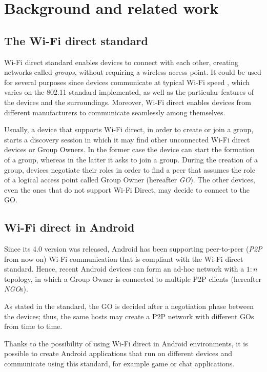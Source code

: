 \section{Background and related work} %
\subsection{The Wi-Fi direct standard}
Wi-Fi direct standard enables devices to connect with each other, creating 
networks called \textit{groups}, without requiring a wireless access point. It
could be used for several purposes since devices communicate at typical Wi-Fi
speed \cite{bib:wifiP2pspec}, which varies on the 802.11 standard implemented,
as well as the particular features of the devices and the surroundings.
Moreover, Wi-Fi direct enables devices from different manufacturers to
communicate seamlessly among themselves.

Usually, a device that supports Wi-Fi direct, in order to create or join a
group, starts a discovery session in which it may find other unconnected Wi-Fi
direct devices or Group Owners.
In the former case the device can start the formation of a group, whereas in
the latter it asks to join a group.
During the creation of a group,
devices negotiate their roles in order to find a peer that assumes the role of 
a logical access point called Group Owner (hereafter \textit{GO}). The other 
devices, even the ones that do not support Wi-Fi Direct, may decide to connect
to the GO.

\subsection{Wi-Fi direct in Android}
Since its 4.0 version was released, Android has been supporting peer-to-peer 
(\textit{P2P} from now on) Wi-Fi communication that is compliant with the 
Wi-Fi direct standard\cite{bib:wifiP2pspec}. 
Hence, recent Android devices can form an ad-hoc network with a $1:n$ topology,
in which a Group Owner is connected to multiple P2P clients (hereafter \textit{NGO}s).

As stated in the standard, the GO is decided after a negotiation phase between
the devices; thus, the same hosts may create a P2P network with different GOs
from time to time.

Thanks to the possibility of using Wi-Fi direct in Android environments, it is
possible to create Android applications that run on different devices and
communicate using this standard, for example game or chat applications.

